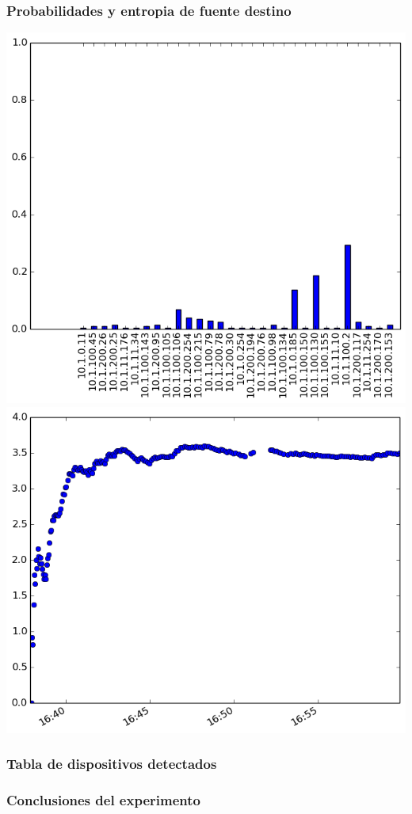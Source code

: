 \subsubsection{Probabilidades y entropia de fuente destino}
\includegraphics[scale=0.33]{../experimentacion-svilerino/licar/histogram_dst_probabilities.png}
\includegraphics[scale=0.33]{../experimentacion-svilerino/licar/entropy_dst.png}

\subsubsection{Tabla de dispositivos detectados}


\subsubsection{Conclusiones del experimento}